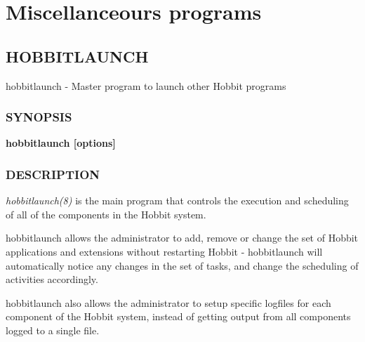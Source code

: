 %
\chapter{Miscellanceours programs}

%
\newpage
\section{HOBBITLAUNCH}
 hobbitlaunch - Master program to launch other Hobbit programs 

 
\subsection{SYNOPSIS}
\textbf{hobbitlaunch [options]}


 
\subsection{DESCRIPTION}
\emph{hobbitlaunch(8)} is the main program that controls the execution
and scheduling of all of the components in the Hobbit system. 


  hobbitlaunch allows the administrator to add, remove or change the
  set of Hobbit applications and extensions without restarting Hobbit
  - hobbitlaunch will automatically notice any changes in the set of
  tasks, and change the scheduling of activities accordingly. 



  hobbitlaunch also allows the administrator to setup specific
  logfiles for each component of the Hobbit system, instead of getting
  output from all components logged to a single file. 



 
